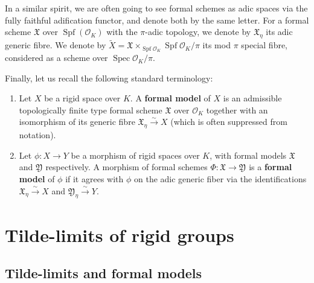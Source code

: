 \documentclass[10pt,oneside]{amsart}
\theoremstyle{definition}
\begin{document}
	In a similar spirit, we are often going to see formal schemes as adic spaces via the fully faithful adification functor, and denote both by the same letter. 
	For a formal scheme $\mathfrak X$ over $\operatorname{Spf}(\mathcal O_K)$ with the $\pi$-adic topology, we denote by $\mathfrak X_\eta$ its adic generic fibre. 
	We denote by $\tilde{X}=\mathfrak X\times_{\operatorname{Spf}\mathcal O_K}\operatorname{Spf}\mathcal O_K/\pi$ its mod $\pi$ special fibre, considered as a scheme over $\operatorname{Spec}\mathcal O_K/\pi$. 

	Finally, let us recall the following standard terminology: 
		\begin{enumerate}
			\item Let $X$ be a rigid space over $K$. A \textbf{formal model} of $X$ is an admissible topologically finite type formal scheme $\mathfrak X$ over $\mathcal O_K$ together with an isomorphism of its generic fibre $\mathfrak X_\eta \xrightarrow{\sim} X$ (which is often suppressed from notation).
			\item Let $\phi:  X\rightarrow  Y$ be a morphism of rigid spaces over $K$, with formal models $\mathfrak X$ and $\mathfrak Y$	respectively. A morphism of formal schemes $\Phi:\mathfrak X \rightarrow \mathfrak Y$ is a \textbf{formal model} of $\phi$ if it agrees with $\phi$ on the adic generic fiber via the identifications $\mathfrak X_\eta \xrightarrow{\sim} X$ and $\mathfrak Y_\eta \xrightarrow{\sim} Y$.
		\end{enumerate}


	
	\section{Tilde-limits of rigid groups} \label{section:tilde_limit}
  
	

		\subsection{Tilde-limits and formal models} 
		
\end{document}
